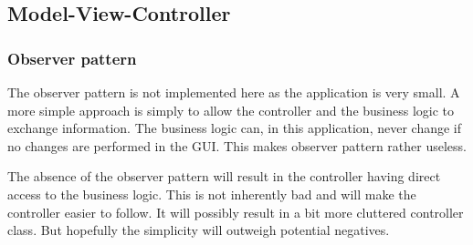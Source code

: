 
\subsection{Model-View-Controller}

\subsubsection{Observer pattern}

The observer pattern is not implemented here as the application is very small. A
more simple approach is simply to allow the controller and the business logic to
exchange information. The business logic can, in this application, never change
if no changes are performed in the GUI. This makes observer pattern rather
useless. 

The absence of the observer pattern will result in the controller having direct
access to the business logic. This is not inherently bad and will make the
controller easier to follow. It will possibly result in a bit more cluttered
controller class. But hopefully the simplicity will outweigh potential
negatives. 





